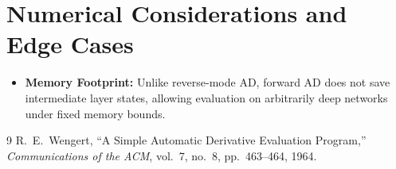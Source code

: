 \documentclass[11pt]{article}
\begin{document}
\section{Numerical Considerations and Edge Cases}
\label{sec:numerical}

\begin{itemize}
    \item \textbf{Memory Footprint:} Unlike reverse-mode AD, forward AD does not save intermediate layer states, allowing evaluation on arbitrarily deep networks under fixed memory bounds.
\end{itemize}

\begin{thebibliography}{9}
 R.~E.~Wengert, ``A Simple Automatic Derivative Evaluation Program,'' \emph{Communications of the ACM}, vol.~7, no.~8, pp.~463--464, 1964.
\end{thebibliography}
\end{document}
